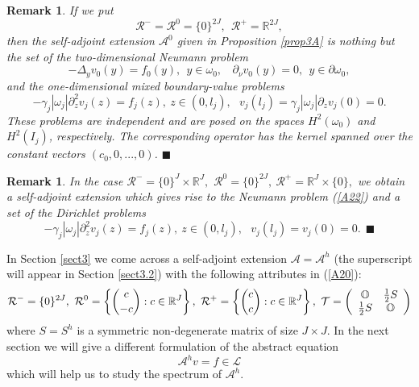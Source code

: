 \documentclass[11pt]{article}%
\newtheorem{remark}[theorem]{Remark}
\numberwithin{equation}{section}
\begin{document}
\begin{remark}
\label{remSIMPLE}If we put
\begin{equation}
\mathcal{R}^{-}=\mathcal{R}^{0}=\{0\}^{2J},\ \ \mathcal{R}^{+}=\mathbb{R}%
^{2J}, \label{A21}%
\end{equation}
then the self-adjoint extension $\mathcal{A}^{0}$ given in Proposition
\ref{prop3A} is nothing but the set of the two-dimensional Neumann problem%
\begin{equation}
-\Delta_{y}v_{0}(y)=f_{0}(y),\ \ y\in\omega_{0},\ \ \ \ \partial_{\nu}%
v_{0}(y)=0,\ \ y\in\partial\omega_{0}, \label{A22}%
\end{equation}
and the one-dimensional mixed boundary-value problems%
\begin{equation}
-\gamma_{j}|\omega_{j}|\partial_{z}^{2}v_{j}(z)=f_{j}(z),\ z\in(0,l_{j}%
),\ \ \ v_{j}(l_{j})=\gamma_{j}|\omega_{j}|\partial_{z}v_{j}(0)=0. \label{A23}%
\end{equation}
These problems are independent and are posed on the spaces $H^{2}(\omega_{0})$
and $H^{2}(I_{j})$, respectively. The corresponding operator has the kernel
spanned over the constant vectors $(c_{0},0,...,0)$. $\blacksquare$
\end{remark}

\begin{remark}
\label{remDIRI}In the case $\mathcal{R}^{-}=\{0\}^{J}\times\mathbb{R}^{J},$
$\mathcal{R}^{0}=\{0\}^{2J},\ \mathcal{R}^{+}=\mathbb{R}^{J}\times\{0\},$ we
obtain a self-adjoint extension which gives rise to the Neumann problem
(\ref{A22}) and a set of the Dirichlet problems%
\[
-\gamma_{j}|\omega_{j}|\partial_{z}^{2}v_{j}(z)=f_{j}(z),\ z\in(0,l_{j}%
),\ \ \ v_{j}(l_{j})=v_{j}(0)=0.\ \ \blacksquare
\]

\end{remark}

In Section \ref{sect3} we come across a self-adjoint extension $\mathcal{A}%
=\mathcal{A}^{h}$ (the superscript will appear in Section \ref{sect3.2}) with
the following attributes in (\ref{A20}):%
\begin{equation}
\mathcal{R}^{-}=\{0\}^{2J},\ \mathcal{R}^{0}=\left\{  \binom{c}{-c}%
:c\in\mathbb{R}^{J}\right\}  ,\ \mathcal{R}^{+}=\left\{  \binom{c}{c}%
:c\in\mathbb{R}^{J}\right\}  ,\ \mathcal{T}=\left(
\begin{array}
[c]{cc}%
\mathbb{O} & \frac{1}{2}S\\
\frac{1}{2}S & \mathbb{O}%
\end{array}
\right)  \label{A24}%
\end{equation}
where $S=S^{h}$ is a symmetric non-degenerate matrix of size $J\times J$. In
the next section we will give a different formulation of the abstract equation%
\begin{equation}
\mathcal{A}^{h}v=f\in\mathcal{L} \label{A25}%
\end{equation}
which will help us to study the spectrum of $\mathcal{A}^{h}.$
\end{document}
